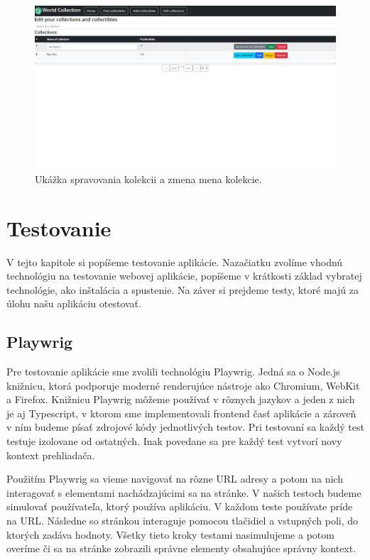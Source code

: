 \begin{figure}[h]
      \includegraphics[width=140mm]{../img/ud-spravovanie.png}
      \centering
      \caption{Ukážka spravovania kolekcii a zmena mena kolekcie.}
\end{figure}


\chapter{Testovanie }
V tejto kapitole si popíšeme testovanie aplikácie. Nazačiatku zvolíme vhodnú technológiu na testovanie webovej aplikácie, popíšeme v krátkosti 
základ vybratej technológie, ako inštalácia a spustenie. Na záver si prejdeme testy, ktoré majú za úlohu našu aplikáciu otestovať. 

\section{Playwrig}

Pre testovanie aplikácie sme zvolili technológiu Playwrig. Jedná sa o Node.js knižnicu, ktorá podporuje moderné renderujúce nástroje ako Chromium, WebKit a Firefox. 
Knižnicu Playwrig môžeme používať v rôznych jazykov a jeden z nich je aj Typescript, v ktorom sme implementovali frontend časť aplikácie a zároveň v ním budeme písať zdrojové kódy jednotlivých testov. 
Pri testovaní sa každý test testuje izolovane od ostatných. Inak povedane sa pre každý test vytvorí novy kontext prehliadača. 

Použitím Playwrig sa vieme navigovať na rôzne URL adresy a potom na nich interagovať s elementami nachádzajúcimi sa na stránke. V našich testoch budeme simulovať používateľa, ktorý používa aplikáciu. 
V každom teste používate príde na URL. Následne so stránkou interaguje  pomocou tlačidiel a vstupných poli, do ktorých zadáva hodnoty. Všetky tieto kroky testami nasimulujeme a potom overíme či sa  
na stránke zobrazili správne elementy obsahujúce správny kontext. 

